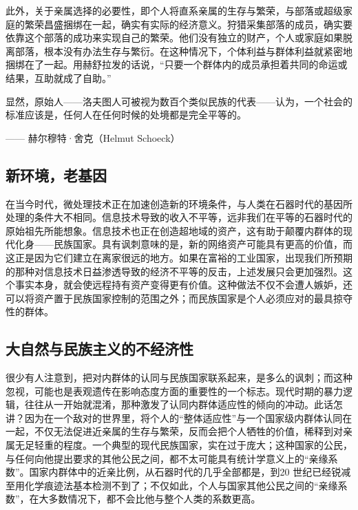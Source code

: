 此外，关于亲属选择的必要性，即个人将直系亲属的生存与繁荣，与部落或超级家庭的繁荣昌盛捆绑在一起，确实有实际的经济意义。狩猎采集部落的成员，确实要依靠这个部落的成功来实现自己的繁荣。他们没有独立的财产，个人或家庭如果脱离部落，根本没有办法生存与繁衍。在这种情况下，个体利益与群体利益就紧密地捆绑在了一起。用赫舒拉发的话说，“只要一个群体内的成员承担着共同的命运或结果，互助就成了自助。”

\begin{tcolorbox}
显然，原始人——洛夫图人可被视为数百个类似民族的代表——认为，一个社会的标准应该是，任何人在任何时候的处境都是完全平等的。  
\begin{flushright}
—— 赫尔穆特·舍克（Helmut Schoeck） 
\end{flushright}
\end{tcolorbox}


\subsection{新环境，老基因}
在当今时代，微处理技术正在加速创造新的环境条件，与人类在石器时代的基因所处理的条件大不相同。信息技术导致的收入不平等，远非我们在平等的石器时代的原始祖先所能想象。信息技术也正在创造超地域的资产，这有助于颠覆内群体的现代化身——民族国家。具有讽刺意味的是，新的网络资产可能具有更高的价值，而这正是因为它们建立在离家很远的地方。如果在富裕的工业国家，出现我们所预期的那种对信息技术日益渗透导致的经济不平等的反击，上述发展只会更加强烈。这个事实本身，就会使远程持有资产变得更有价值。这种做法不仅不会遭人嫉妒，还可以将资产置于民族国家控制的范围之外；而民族国家是个人必须应对的最具掠夺性的群体。

\subsection{大自然与民族主义的不经济性}
很少有人注意到，把对内群体的认同与民族国家联系起来，是多么的讽刺；而这种忽视，可能也是表观遗传在影响态度方面的重要性的一个标志。现代时期的暴力逻辑，往往从一开始就混淆，那种激发了认同内群体适应性的倾向的冲动。此话怎讲？因为在一个敌对的世界里，将个人的“整体适应性”与一个国家级内群体认同在一起，不仅无法促进近亲属的生存与繁荣，反而会把个人牺牲的价值，稀释到对亲属无足轻重的程度。一个典型的现代民族国家，实在过于庞大；这种国家的公民，与任何向他提出要求的其他公民之间，都不太可能具有统计学意义上的“亲缘系数”。国家内群体中的近亲比例，从石器时代的几乎全部都是，到20 世纪已经锐减至用化学痕迹法基本检测不到了；不仅如此，个人与国家其他公民之间的“亲缘系数”，在大多数情况下，都不会比他与整个人类的系数更高。

